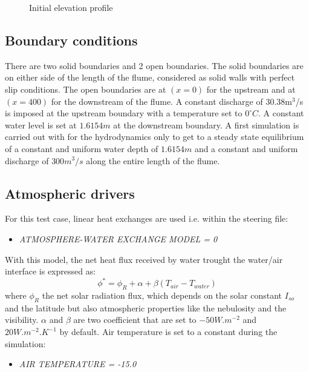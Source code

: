 \begin{figure}[H]
    \begin{center}
    \end{center}
    \caption{Initial elevation profile}
    \label{fig:growth_profile}
\end{figure}

\subsection{Boundary conditions}

There are two solid boundaries and 2 open boundaries.
The solid boundaries are on either side of the length of the flume, considered as solid walls with perfect slip conditions.
The open boundaries are at $(x=0)$ for the upstream and at $(x=400)$ for the downstream of the flume. A constant discharge of $30.38$m$^3$/s is imposed at the upstream boundary with a temperature set to $0^{\circ} C$. A constant water level is set at $1.6154m$ at the downstream boundary.
A first simulation is carried out with for the hydrodynamics only to get to a steady state equilibrium of a constant and uniform water depth of $1.6154m$ and a constant and uniform discharge of $300m^3/s$ along the entire length of the flume.

\subsection{Atmospheric drivers}

For this test case, linear heat exchanges are used i.e. within the \khione steering file:
\begin{itemize}
	\item\textit{ATMOSPHERE-WATER EXCHANGE MODEL = 0}
\end{itemize}

With this model, the net heat flux received by water trought the water/air interface is expressed as:
\begin{equation}
\phi^* = \phi_R + \alpha + \beta (T_{air} - T_{water})
\end{equation}
where $\phi_R$ the net solar radiation flux, which depends on the solar constant $I_{so}$ and the latitude but
also atmospheric properties like the nebulosity and the visibility. $\alpha$ and $\beta$ are two coefficient that
are set to $-50W.m^{-2}$ and $20W.m^{-2}.K^{-1}$ by default.
Air temperature is set to a constant during the simulation:
\begin{itemize}
	\item\textit{AIR TEMPERATURE      = -15.0}
\end{itemize}

